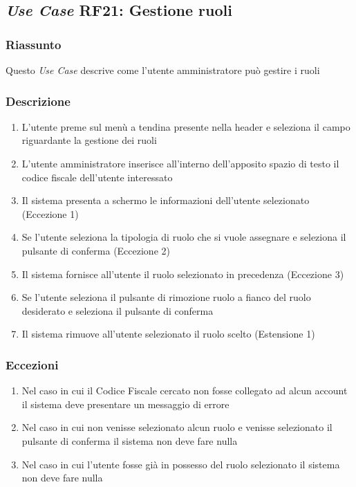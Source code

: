     \subsection{\textit{Use Case} RF21: Gestione ruoli}
        \subsubsection{Riassunto}
            Questo \textit{Use Case} descrive come l'utente amministratore può gestire i ruoli
        \subsubsection{Descrizione}
            \begin{enumerate}
                \item L'utente preme sul menù a tendina presente nella header e seleziona il campo riguardante la gestione dei ruoli
                \item L'utente amministratore inserisce all'interno dell'apposito spazio di testo il codice fiscale dell'utente interessato
                \item Il sistema presenta a schermo le informazioni dell'utente selezionato (Eccezione 1)
                \item Se l'utente seleziona la tipologia di ruolo che si vuole assegnare e seleziona il pulsante di conferma (Eccezione 2)
                \item Il sistema fornisce all'utente il ruolo selezionato in precedenza (Eccezione 3)
                \item Se l'utente seleziona il pulsante di rimozione ruolo a fianco del ruolo desiderato e seleziona il pulsante di conferma
                \item Il sistema rimuove all'utente selezionato il ruolo scelto (Estensione 1)
            \end{enumerate}
        \subsubsection{Eccezioni}
            \begin{enumerate}
                \item Nel caso in cui il Codice Fiscale cercato non fosse collegato ad alcun account il sistema deve presentare un messaggio di errore
                \item Nel caso in cui non venisse selezionato alcun ruolo e venisse selezionato il pulsante di conferma il sistema non deve fare nulla
                \item Nel caso in cui l'utente fosse già in possesso del ruolo selezionato il sistema non deve fare nulla
            \end{enumerate}
